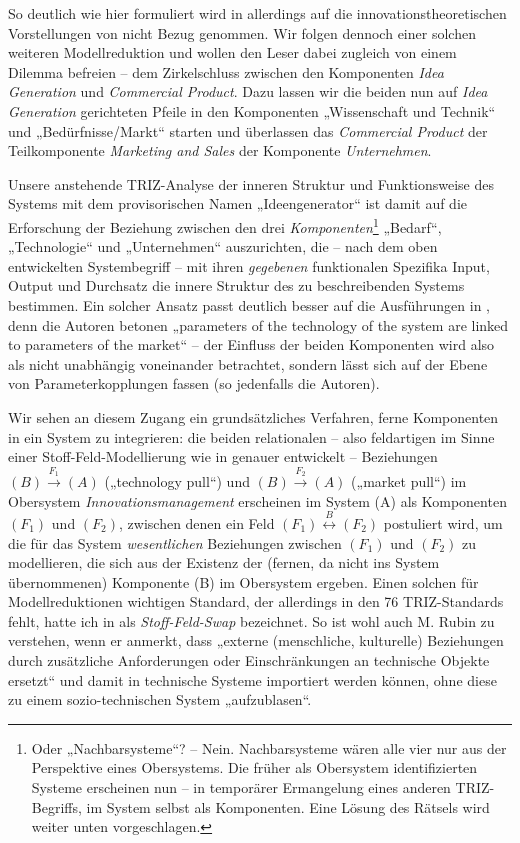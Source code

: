 \documentclass[11pt,a4paper]{article}
\begin{document}
So deutlich wie hier formuliert wird in \cite{TESE2018} allerdings auf die
innovationstheoretischen Vorstellungen von \cite{Preez2006} nicht Bezug
genommen.  Wir folgen dennoch einer solchen weiteren Modellreduktion und
wollen den Leser dabei zugleich von einem Dilemma befreien -- dem
Zirkelschluss zwischen den Komponenten \emph{Idea Generation} und
\emph{Commercial Product}.  Dazu lassen wir die beiden nun auf \emph{Idea
  Generation} gerichteten Pfeile in den Komponenten „Wissenschaft und Technik“
und „Bedürfnisse/Markt“ starten und überlassen das \emph{Commercial Product}
der Teilkomponente \emph{Marketing and Sales} der Komponente
\emph{Unternehmen}.

Unsere anstehende TRIZ-Analyse der inneren Struktur und Funktionsweise des
Systems mit dem provisorischen Namen „Ideengenerator“ ist damit auf die
Erforschung der Beziehung zwischen den drei \emph{Komponenten}\footnote{Oder
  „Nachbarsysteme“?  -- Nein. Nachbarsysteme wären alle vier nur aus der
  Perspektive eines Obersystems.  Die früher als Obersystem identifizierten
  Systeme erscheinen nun -- in temporärer Ermangelung eines anderen
  TRIZ-Begriffs, im System selbst als Komponenten. Eine Lösung des Rätsels
  wird weiter unten vorgeschlagen. } „Bedarf“, „Technologie“ und „Unternehmen“
auszurichten, die -- nach dem oben entwickelten Systembegriff -- mit ihren
\emph{gegebenen} funktionalen Spezifika Input, Output und Durchsatz die innere
Struktur des zu beschreibenden Systems bestimmen.  Ein solcher Ansatz passt
deutlich besser auf die Ausführungen in \cite[Kap. 1]{TESE2018}, denn die
Autoren betonen „parameters of the technology of the system are linked to
parameters of the market“ -- der Einfluss der beiden Komponenten wird also als
nicht unabhängig voneinander betrachtet, sondern lässt sich auf der Ebene von
Parameterkopplungen fassen (so jedenfalls die Autoren).

Wir sehen an diesem Zugang ein grundsätzliches Verfahren, ferne Komponenten in
ein System zu integrieren: die beiden relationalen -- also feldartigen im
Sinne einer Stoff-Feld-Modellierung wie in \cite[Kap. 4.9]{KS2017} genauer
entwickelt -- Beziehungen $(B)\stackrel{F_1}{\longrightarrow} (A)$
(„technology pull“) und $(B) \stackrel{F_2}{\longrightarrow} (A)$ („market
pull“) im Obersystem \emph{Innovationsmanagement} erscheinen im System (A) als
Komponenten $(F_1)$ und $(F_2)$, zwischen denen ein Feld
$(F_1)\stackrel{B}{\longleftrightarrow}(F_2)$ postuliert wird, um die für das
System \emph{wesentlichen} Beziehungen zwischen $(F_1)$ und $(F_2)$ zu
modellieren, die sich aus der Existenz der (fernen, da nicht ins System
übernommenen) Komponente (B) im Obersystem ergeben.  Einen solchen für
Modellreduktionen wichtigen Standard, der allerdings in den 76 TRIZ-Standards
fehlt, hatte ich in \cite{Graebe2019a} als \emph{Stoff-Feld-Swap} bezeichnet.
So ist wohl auch M. Rubin zu verstehen, wenn er anmerkt, dass „externe
(menschliche, kulturelle) Beziehungen durch zusätzliche Anforderungen oder
Einschränkungen an technische Objekte ersetzt“ und damit in technische Systeme
importiert werden können, ohne diese zu einem sozio-technischen System
„aufzublasen“.
\end{document}
